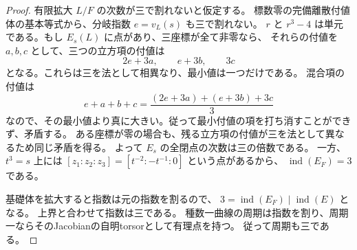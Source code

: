 \begin{proof}
有限拡大 $L/F$ の次数が三で割れないと仮定する。
標数零の完備離散付値体の基本等式から、分岐指数 $e=v_L(s)$ も三で割れない。
$r$ と $r^3-4$ は単元である。もし $E_s(L)$ に点があり、三座標が全て非零なら、
それらの付値を $a,b,c$ として、三つの立方項の付値は
\[
 2e+3a,\qquad e+3b,\qquad 3c
\]
となる。これらは三を法として相異なり、最小値は一つだけである。
混合項の付値は
\[
 e+a+b+c=\frac{(2e+3a)+(e+3b)+3c}{3}
\]
なので、その最小値より真に大きい。従って最小付値の項を打ち消すことができず、矛盾する。
ある座標が零の場合も、残る立方項の付値が三を法として異なるため同じ矛盾を得る。
よって $E_s$ の全閉点の次数は三の倍数である。
一方、$t^3=s$ 上には
$[z_1:z_2:z_3]=[t^{-2}:-t^{-1}:0]$ という点があるから、
$\operatorname{ind}(E_F)=3$ である。

基礎体を拡大すると指数は元の指数を割るので、
$3=\operatorname{ind}(E_F)\mid\operatorname{ind}(E)$ となる。
上界と合わせて指数は三である。
種数一曲線の周期は指数を割り、周期一ならそのJacobianの自明torsorとして有理点を持つ。
従って周期も三である。
\end{proof}
